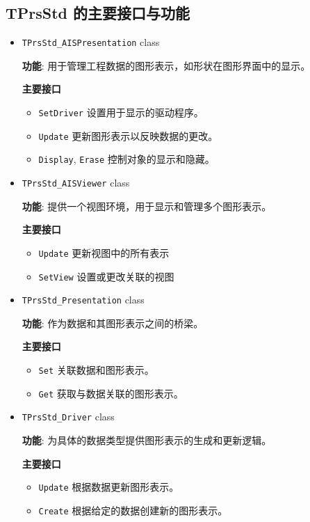 \documentclass[11pt]{article}
\begin{document}
\subsection{TPrsStd 的主要接口与功能}
\label{sec:orgb1a8e5c}

\begin{itemize}
\item \texttt{TPrsStd\_AISPresentation} class

\textbf{功能}: 用于管理工程数据的图形表示，如形状在图形界面中的显示。

\textbf{主要接口}

\begin{itemize}
\item \texttt{SetDriver} 设置用于显示的驱动程序。
\item \texttt{Update} 更新图形表示以反映数据的更改。
\item \texttt{Display}, \texttt{Erase} 控制对象的显示和隐藏。
\end{itemize}

\item \texttt{TPrsStd\_AISViewer} class

\textbf{功能}: 提供一个视图环境，用于显示和管理多个图形表示。

\textbf{主要接口}

\begin{itemize}
\item \texttt{Update} 更新视图中的所有表示
\item \texttt{SetView} 设置或更改关联的视图
\end{itemize}

\item \texttt{TPrsStd\_Presentation} class

\textbf{功能}: 作为数据和其图形表示之间的桥梁。

\textbf{主要接口}

\begin{itemize}
\item \texttt{Set} 关联数据和图形表示。
\item \texttt{Get} 获取与数据关联的图形表示。
\end{itemize}

\item \texttt{TPrsStd\_Driver} class

\textbf{功能}: 为具体的数据类型提供图形表示的生成和更新逻辑。

\textbf{主要接口}

\begin{itemize}
\item \texttt{Update} 根据数据更新图形表示。
\item \texttt{Create} 根据给定的数据创建新的图形表示。
\end{itemize}
\end{itemize}
\end{document}
